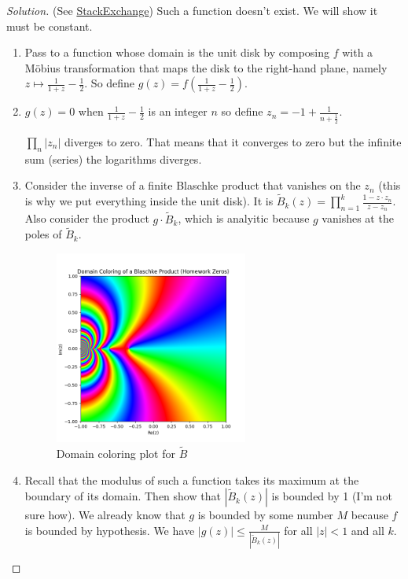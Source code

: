 \begin{proof}[Solution]\leavevmode 
	(See \href{https://math.stackexchange.com/questions/380446/prove-that-a-bounded-analytic-function-in-the-right-half-plane-which-vanishes-at}{StackExchange}) Such a function doesn't exist. We will show it must be constant.
\begin{enumerate}[label=\textbf{Step \arabic*}]
		\item Pass to a function whose domain is the unit disk by composing $f$ with a M\"obius transformation that maps the disk to the right-hand plane, namely $z\mapsto \frac{1}{1+z}-\frac{1}{2}$. So define $g(z)=f\left( \frac{1}{1+z}-\frac{1}{2} \right) $.

		\item $g(z)=0$ when $\frac{1}{1+z}-\frac{1}{2}$ is an integer $n$ so define $z_{n}=-1+\frac{1}{n+\frac{1}{2}}$.

		$\prod_{n} |z_{n}| $ diverges to zero. That means that it converges to zero but the infinite sum (series) the logarithms diverges.

		\item Consider the inverse of a finite Blaschke product that vanishes on the $z_{n}$ (this is why we put everything inside the unit disk). It is $\tilde{B}_{k}(z)=\prod_{n=1}^{k} \frac{1-z\cdot z_{n}}{z-z_{n}}  $. Also consider the product $g\cdot \tilde{B}_{k}$, which is analyitic because $g$ vanishes at the poles of $\tilde{B}_{k}$.
\begin{figure}[H]
	\centering
	\includegraphics[width=0.6\textwidth]{Figure_1.png}
	\caption{Domain coloring plot for $\tilde{B}$}
\end{figure}

		\item Recall that the modulus of such a function takes its maximum at the boundary of its domain. Then show that $|\tilde{B}_{k}(z)|$ is bounded by 1 (I'm not sure how). We already know that $g$ is bounded by some number $M$ because $f$ is bounded by hypothesis. We have $|g(z)| \leq \frac{M}{|\tilde{B}_{k}(z)|}$ for all $|z|<1$ and all $k$.


\end{enumerate}
\end{proof}
